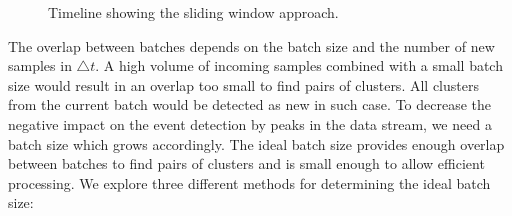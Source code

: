 \begin{figure}[h]
    \centering


    \caption{Timeline showing the sliding window approach.}
    \label{fig:timeline}
\end{figure}

The overlap between batches depends on the batch size and the number of new samples in $\triangle t$.
A high volume of incoming samples combined with a small batch size
would result in an overlap too small to find pairs of clusters.
All clusters from the current batch would be detected as new in such case.
To decrease the negative impact on the event detection by peaks in the data stream,
we need a batch size which grows accordingly.
The ideal batch size provides enough overlap between batches to find pairs of clusters
and is small enough to allow efficient processing.
We explore three different methods for determining the ideal batch size:

